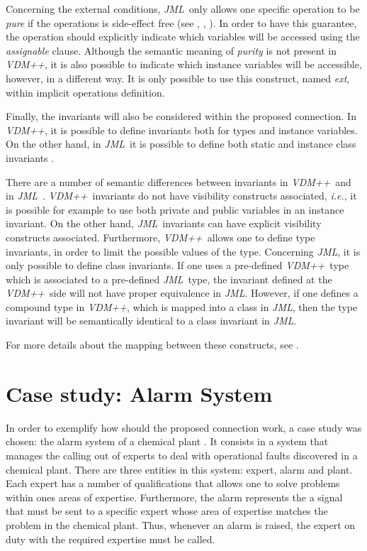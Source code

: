 \documentclass{llncs}
\newcommand{\jml}{\textit{JML}}
\newcommand{\vpp}{\textit{VDM++}}
\newcommand{\ie}{\textit{i.e.}}
\begin{document}
Concerning the external conditions, \jml\ only allows one specific operation to be \textit{pure} if the operations is side-effect free (see \cite{darvas-mueller-05}, \cite{leavens-Baker-Ruby99b}, \cite{leavens-etal07}). In order to have this guarantee, the operation should explicitly indicate which variables will be accessed using the \textit{assignable} clause. Although the semantic meaning of \textit{purity} is not present in \vpp, it is also possible to indicate which instance variables will be accessible, however, in a different way. It is only possible to use this construct, named \textit{ext}, within implicit operations definition. 

Finally, the invariants will also be considered within the proposed connection. In \vpp, it is possible to define invariants both for types and instance variables. On the other hand, in \jml\ it is possible to define both static and instance class invariants \cite{leavens-etal07}. 

There are a number of semantic differences between invariants in \vpp\ and in \jml\ \cite{vppjmlthesis}. \vpp\ invariants do not have visibility constructs associated, \ie, it is possible for example to use both private and public variables in an instance invariant. On the other hand, \jml\ invariants can have explicit visibility constructs associated. Furthermore, \vpp\ allows one to define type invariants, in order to limit the possible values of the type. Concerning \jml, it is only possible to define class invariants. If one uses a pre-defined \vpp\ type which is associated to a pre-defined \jml\ type, the invariant defined at the \vpp\ side will not have proper equivalence in \jml. However, if one defines a compound type in \vpp, which is mapped into a class in \jml, then the type invariant will be semantically identical to a class invariant in \jml. 

For more details about the mapping between these constructs, see \cite{vppjmlthesis}.


\section{Case study: Alarm System}
\label{sec:casestudy}

In order to exemplify how should the proposed connection work, a case study was chosen: the  alarm system of a chemical plant \cite{Fitzgerald&05}. It consists in a system that manages the calling out of experts to deal with operational faults discovered in a chemical plant. There are three entities in this system: expert, alarm and plant. Each expert has a number of qualifications that allows one to solve problems within ones areas of expertise. Furthermore, the alarm represents the a signal that must be sent to a specific expert whose area of expertise matches the problem in the chemical plant. Thus, whenever an alarm is raised, the expert on duty with the required expertise must be called. 
\end{document}
